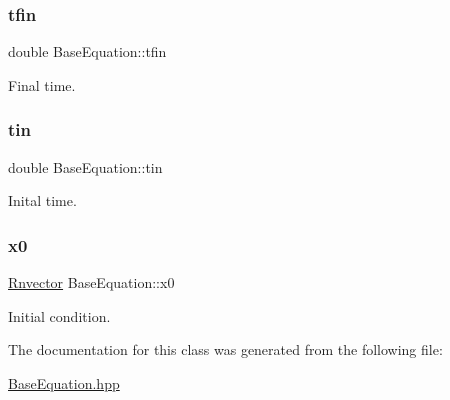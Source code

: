 \subsubsection{\texorpdfstring{tfin}{tfin}}
{\footnotesize\ttfamily double Base\+Equation\+::tfin\hspace{0.3cm}{\ttfamily [private]}}



Final time. 

\mbox{\label{classBaseEquation_a9003149a3218fd7994c18914cd4446b8}} 
\subsubsection{\texorpdfstring{tin}{tin}}
{\footnotesize\ttfamily double Base\+Equation\+::tin\hspace{0.3cm}{\ttfamily [private]}}



Inital time. 

\mbox{\label{classBaseEquation_a86cd7c1803bac9d80e15b4dc81571fa7}} 
\subsubsection{\texorpdfstring{x0}{x0}}
{\footnotesize\ttfamily \hyperlink{utils_8hpp_a8e0cccfe9e5cee5140bfcfbd9a3a6a0e}{Rnvector} Base\+Equation\+::x0\hspace{0.3cm}{\ttfamily [private]}}



Initial condition. 



The documentation for this class was generated from the following file\+:\begin{DoxyCompactItemize}
\item 
\hyperlink{BaseEquation_8hpp}{Base\+Equation.\+hpp}\end{DoxyCompactItemize}
